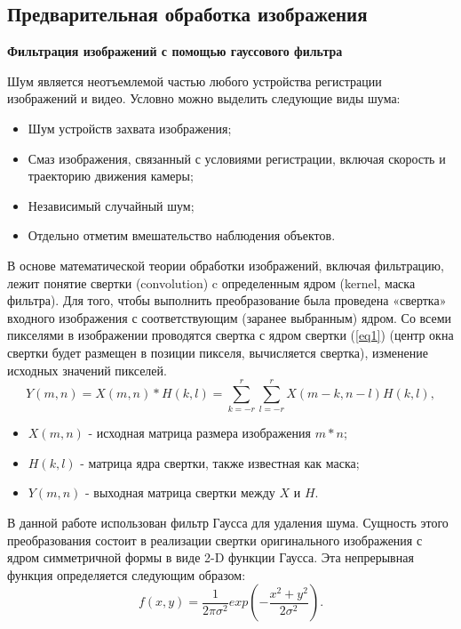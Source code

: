 \subsection{Предварительная обработка изображения} \label{part2.2.1}
\textbf {Фильтрация изображений с помощью гауссового фильтра}

Шум является неотъемлемой частью любого устройства регистрации изображений и видео. Условно можно выделить следующие виды шума:

\begin{itemize}
	\item Шум  устройств захвата изображения;
	\item Смаз изображения, связанный с условиями регистрации, включая скорость и траекторию движения камеры;
	\item Независимый случайный шум;
	\item Отдельно отметим вмешательство наблюдения объектов.
\end{itemize}

В основе математической теории обработки изображений, включая фильтрацию, лежит понятие свертки (convolution) c определенным ядром (kernel, маска фильтра). Для того, чтобы выполнить преобразование была проведена «свертка» входного изображения с соответствующим (заранее выбранным) ядром. Со всеми пикселями в изображении проводятся свертка с ядром свертки (\ref{eq1}) (центр окна свертки будет размещен в позиции пикселя, вычисляется свертка), изменение исходных значений пикселей.
\begin{equation}\label{eq1}
Y\left(m,n\right)=X\left(m,n\right)\ast H\left(k,l\right)=\sum^r_{k=-r}\sum^r_{l=-r}X\left(m-k,n-l\right)H\left(k,l\right),
\end{equation}

\begin{itemize}
	\item $X\left(m,n\right)$ - исходная матрица размера изображения $m\ast n$;
	\item $H\left(k,l\right)$ - матрица ядра свертки, также известная как маска;
	\item $Y\left(m,n\right)$ - выходная матрица свертки между $X$ и $H$.
\end{itemize}

В данной работе использован фильтр Гаусса для удаления шума. Сущность этого преобразования состоит в реализации свертки оригинального изображения с ядром симметричной формы в виде 2-D функции Гаусса. Эта непрерывная функция определяется следующим образом:
\begin{equation}\label{eq2}
f\left(x,y\right)=\frac{1}{2\pi\sigma^2}exp\left(-\frac{x^2+y^2}{2\sigma^2}\right).
\end{equation}


